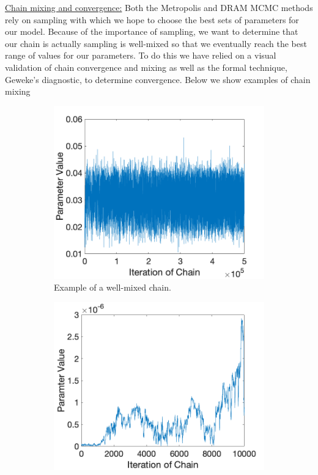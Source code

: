 \documentclass{article}
\begin{document}
\underline{Chain mixing and convergence:} Both the Metropolis and DRAM MCMC methods rely on sampling with which we hope to choose the best sets of parameters for our model. Because of the importance of sampling, we want to determine that our chain is actually sampling is well-mixed so that we eventually reach the best range of values for our parameters. To do this we have relied on a visual validation of chain convergence and mixing as well as the formal technique, Geweke's diagnostic, to determine convergence. Below we show examples of chain mixing\\
\begin{figure}[H]
\begin{subfigure}{.5\textwidth}
  \centering
  \includegraphics[width=.8\linewidth]{MCMC_figs/chain_mix_ex1.png}
  \caption{Example of a well-mixed chain.}
  \label{fig:sfig1}
\end{subfigure}%
\begin{subfigure}{.5\textwidth}
  \centering
  \includegraphics[width=.8\linewidth]{MCMC_figs/chain_mix_ex2.png}

\end{subfigure}
\end{figure}
\end{document}

